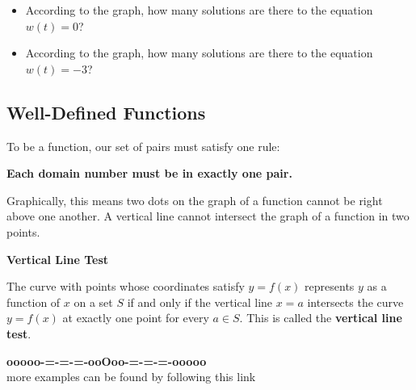 \documentclass{ximera}
\begin{document}
\begin{question}
\begin{itemize}
 
\item According to the graph, how many solutions are there to the equation $w(t) = 0$?
\begin{multipleChoice}
\end{multipleChoice}


\item According to the graph, how many solutions are there to the equation $w(t) = -3$?
\begin{multipleChoice}
\end{multipleChoice}
\end{itemize}
\end{question}















\subsection*{Well-Defined Functions}

To be a function, our set of pairs must satisfy one rule:

\begin{center}
\textbf{Each domain number must be in exactly one pair.}
\end{center}


Graphically, this means two dots on the graph of a function cannot be right above one another. A vertical line cannot intersect the graph of a function in two points. 



\begin{definition} \textbf{\textcolor{green!50!black}{Vertical Line Test}}   


The curve with points whose coordinates satisfy $y=f(x)$ represents $y$ as a function of $x$ on a set $S$ if and only if the vertical line $x=a$ intersects the curve $y=f(x)$ at exactly one point for every $a \in S$. This is called the \textbf{vertical line test}.
\end{definition}












\begin{onlineOnly}
\begin{center}
\textbf{\textcolor{green!50!black}{ooooo-=-=-=-ooOoo-=-=-=-ooooo}} \\

more examples can be found by following this link\\ 

\end{center}
\end{onlineOnly}
\end{document}
